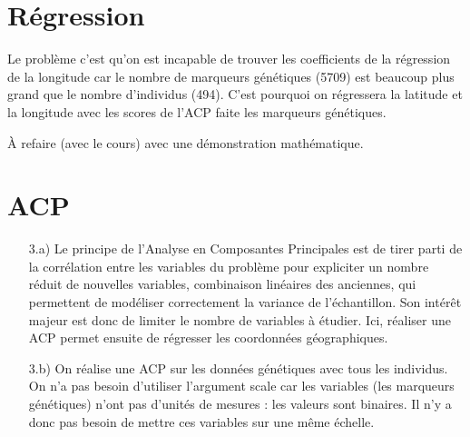 \documentclass[a4paper, 12pt]{article}
\begin{document}
\section{Régression}
Le problème c'est qu'on est incapable de trouver les coefficients de la régression de la longitude car le nombre de marqueurs génétiques (5709) est beaucoup plus grand que le nombre d'individus (494). C'est pourquoi on régressera la latitude et la longitude avec les scores de l'ACP faite les marqueurs génétiques. 

À refaire (avec le cours) avec une démonstration mathématique.

\section{ACP}
\begin{enumerate}
\setlength{\itemsep}{20pt}
\item[3.a)]
 Le principe de l'Analyse en Composantes Principales est de tirer parti de la corrélation entre les variables du problème pour expliciter un nombre réduit de nouvelles variables, combinaison linéaires des anciennes, qui permettent de modéliser correctement la variance de l'échantillon. Son intérêt majeur est donc de limiter le nombre de variables à étudier. Ici, réaliser une ACP permet ensuite de régresser les coordonnées géographiques.

 \item[3.b)]
 On réalise une ACP sur les données génétiques avec tous les individus. 
 On n'a pas besoin d'utiliser l'argument scale car les variables (les marqueurs génétiques) n'ont pas d'unités de mesures : les valeurs sont binaires. Il n'y a donc pas besoin de mettre ces variables sur une même échelle.


\end{enumerate}
\end{document}
